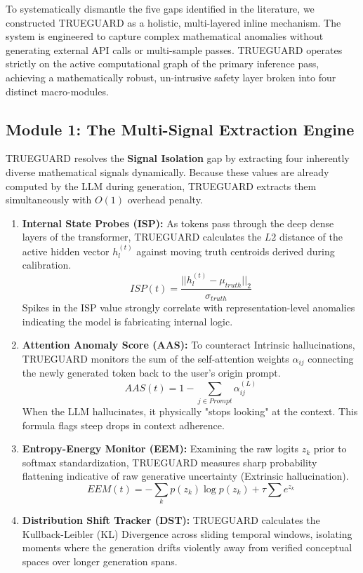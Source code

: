 \documentclass{article}
\begin{document}
To systematically dismantle the five gaps identified in the literature, we constructed TRUEGUARD as a holistic, multi-layered inline mechanism. The system is engineered to capture complex mathematical anomalies without generating external API calls or multi-sample passes. TRUEGUARD operates strictly on the active computational graph of the primary inference pass, achieving a mathematically robust, un-intrusive safety layer broken into four distinct macro-modules.

\subsection{Module 1: The Multi-Signal Extraction Engine}

TRUEGUARD resolves the \textbf{Signal Isolation} gap by extracting four inherently diverse mathematical signals dynamically. Because these values are already computed by the LLM during generation, TRUEGUARD extracts them simultaneously with $O(1)$ overhead penalty.

\begin{enumerate}
    \item \textbf{Internal State Probes (ISP):} As tokens pass through the deep dense layers of the transformer, TRUEGUARD calculates the $L2$ distance of the active hidden vector $h_{l}^{(t)}$ against moving truth centroids derived during calibration.
    \begin{equation}
        ISP(t) = \frac{||h_{l}^{(t)} - \mu_{truth}||_{2}}{\sigma_{truth}}
    \end{equation}
    Spikes in the ISP value strongly correlate with representation-level anomalies indicating the model is fabricating internal logic.

    \item \textbf{Attention Anomaly Score (AAS):} To counteract Intrinsic hallucinations, TRUEGUARD monitors the sum of the self-attention weights $\alpha_{ij}$ connecting the newly generated token back to the user's origin prompt. 
    \begin{equation}
        AAS(t) = 1 - \sum_{j \in Prompt} \alpha_{ij}^{(L)}
    \end{equation}
    When the LLM hallucinates, it physically "stops looking" at the context. This formula flags steep drops in context adherence.

    \item \textbf{Entropy-Energy Monitor (EEM):} Examining the raw logits $z_k$ prior to softmax standardization, TRUEGUARD measures sharp probability flattening indicative of raw generative uncertainty (Extrinsic hallucination).
    \begin{equation}
        EEM(t) = - \sum_{k} p(z_k) \log p(z_k) + \tau \sum e^{z_k}
    \end{equation}

    \item \textbf{Distribution Shift Tracker (DST):} TRUEGUARD calculates the Kullback-Leibler (KL) Divergence across sliding temporal windows, isolating moments where the generation drifts violently away from verified conceptual spaces over longer generation spans.
\end{enumerate}
\end{document}
